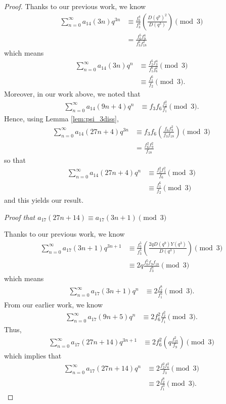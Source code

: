 \documentclass[10pt, reqno]{amsart}
\theoremstyle{theorem}
\theoremstyle{definition}
\theoremstyle{example}
\begin{document}
\begin{proof}
\noindent 
Thanks to our previous work, we know 
\begin{align*}
\sum_{n=0}^\infty a_{14}(3n)q^{3n} 
&\equiv 
\frac{f_6^4}{f_3^4}\left( \frac{D(q^9)^2}{D(q^3)}  \right) \pmod{3} \\
&=
\frac{f_6^5f_9^4}{f_3^6f_{18}^2}
\end{align*}
which means 
\begin{align*}
\sum_{n=0}^\infty a_{14}(3n)q^{n} 
&\equiv 
\frac{f_2^5f_3^4}{f_1^6f_{6}^2} \pmod{3} \\
&\equiv 
\frac{f_1^6}{f_2} \pmod{3}.  
\end{align*}
Moreover, in our work above, we noted that 
\begin{align*}
\sum_{n=0}^\infty a_{14}(9n+4)q^{n} 
&\equiv 
f_3f_6\frac{f_2^2}{f_1} \pmod{3}.
\end{align*}
Hence, using Lemma \ref{lem:psi_3diss},
\begin{align*}
\sum_{n=0}^\infty a_{14}(27n+4)q^{3n} 
&\equiv 
f_3f_6\left( \frac{f_6f_9^2}{f_3f_{18}}  \right) \pmod{3} \\
&= 
\frac{f_6^2f_9^2}{f_{18}} 
\end{align*}
so that 
\begin{align*}
\sum_{n=0}^\infty a_{14}(27n+4)q^{n} 
&\equiv 
\frac{f_2^2f_{3}^2}{f_6}  \pmod{3} \\
&\equiv 
\frac{f_1^6}{f_{2}} \pmod{3} 
\end{align*}
and this yields our result.  

\bigskip  

\noindent
{\it Proof that $a_{17}(27n+14) \equiv a_{17}(3n+1) \pmod{3}$}

\bigskip 

\noindent 
Thanks to our previous work, we know 
\begin{align*}
\sum_{n=0}^\infty a_{17}(3n+1)q^{3n+1} 
&\equiv 
\frac{f_6^5}{f_3^5}\left( \frac{2qD(q^9)Y(q^3)}{D(q^3)} \right) \pmod{3} \\
&\equiv 
2q\frac{f_6^5f_9f_{18}}{f_3^6} \pmod{3}
\end{align*}
which means 
\begin{align*}
\sum_{n=0}^\infty a_{17}(3n+1)q^{n} 
&\equiv 
2\frac{f_2^8}{f_1^3} \pmod{3}.  
\end{align*}
From our earlier work, we know
\begin{align*}
\sum_{n=0}^\infty a_{17}(9n+5)q^{n} 
&\equiv 
2f_6^2\frac{f_2^2}{f_1} \pmod{3}.
\end{align*}
Thus, 
\begin{align*}
\sum_{n=0}^\infty a_{17}(27n+14)q^{3n+1} 
&\equiv 
2f_6^2\left(  q\frac{f_{18}^2}{f_9} \right) \pmod{3} 
\end{align*}
which implies that 
\begin{align*}
\sum_{n=0}^\infty a_{17}(27n+14)q^{n} 
&\equiv 
2\frac{f_2^2f_6^2}{f_3}  \pmod{3}  \\
&\equiv 
2\frac{f_2^8}{f_1^3}  \pmod{3}.
\end{align*}



\end{proof}
\end{document}
